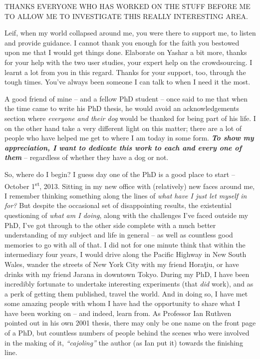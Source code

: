 \begin{preamble}
THANKS EVERYONE WHO HAS WORKED ON THE STUFF BEFORE ME TO ALLOW ME TO INVESTIGATE THIS REALLY INTERESTING AREA.

Leif, when my world collapsed around me, you were there to support me, to listen and provide guidance. I cannot thank you enough for the faith you bestowed upon me that I would get things done. Elaborate on Yashar a bit more, thanks for your help with the two user studies, your expert help on the crowdsourcing. I learnt a lot from you in this regard. Thanks for your support, too, through the tough times. You've always been someone I can talk to when I need it the most.




A good friend of mine -- and a fellow PhD student -- once said to me that when the time came to write his PhD thesis, he would avoid an acknowledgements section where \emph{everyone and their dog} would be thanked for being part of his life. I on the other hand take a very different light on this matter; there are a lot of people who have helped me get to where I am today in some form. \textbf{\emph{To show my appreciation, I want to dedicate this work to each and every one of them}} -- regardless of whether they have a dog or not.

So, where do I begin? I guess day one of the PhD is a good place to start -- October 1\textsuperscript{st}, 2013. Sitting in my new office with (relatively) new faces around me, I remember thinking something along the lines of \emph{what have I just let myself in for?} But despite the occasional set of disappointing results, the existential questioning of \emph{what am I doing}, along with the challenges I've faced outside my PhD, I've got through to the other side complete with a much better understanding of my subject and life in general -- as well as countless good memories to go with all of that. I did not for one minute think that within the intermediary four years, I would drive along the Pacific Highway in New South Wales, wander the streets of New York City with my friend Hora\c{t}iu, or have drinks with my friend Jarana in downtown Tokyo. During my PhD, I have been incredibly fortunate to undertake interesting experiments (that \emph{did} work), and as a perk of getting them published, travel the world. And in doing so, I have met some amazing people with whom I have had the opportunity to share what I have been working on -- and indeed, learn from. As Professor Ian Ruthven pointed out in his own 2001 thesis, there may only be one name on the front page of a PhD, but countless numbers of people behind the scenes who were involved in the making of it, \emph{``cajoling''} the author (as Ian put it) towards the finishing line.


\end{preamble}
